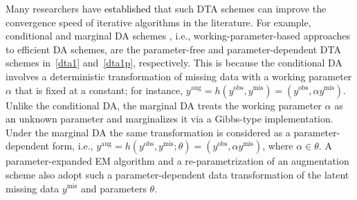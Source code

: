 \documentclass[12pt]{article}
\begin{document}
Many researchers have \textcolor{black}{established} that such DTA schemes can improve the convergence speed of iterative algorithms in the literature. For example, conditional and marginal DA schemes \citep{meng1997folksong, meng1999seeking}, i.e., working-parameter-based approaches to  efficient DA scheme\textcolor{black}{s}, are the parameter-free and  parameter-dependent DTA schemes in~\eqref{dta1} and~\eqref{dta1p}, respectively. This is because the conditional DA  involves a deterministic transformation of missing data with a  working parameter $\alpha$ that is fixed at a constant; for instance, $y^{\textrm{aug}}=h(y^{\textrm{obs}}, y^{\textrm{mis}})=(y^{\textrm{obs}}, \alpha y^{\textrm{mis}})$. Unlike the conditional DA, the marginal DA treats the working parameter $\alpha$ as \textcolor{black}{an} unknown parameter and marginalizes it via a Gibbs-type implementation. Under the marginal DA the same transformation  is considered as a parameter-dependent form, i.e.,  $y^{\textrm{aug}}=h(y^{\textrm{obs}}, y^{\textrm{mis}}; \theta)=(y^{\textrm{obs}}, \alpha y^{\textrm{mis}})$, where $\alpha\in \theta$. A parameter-expanded EM algorithm \citep{liu1998pxem} and  a re-parametrization of an augmentation scheme \citep{papa2007repara} also adopt such a parameter-dependent data transformation of the latent missing data $y^{\textrm{mis}}$ and parameters $\theta$. 

\end{document}
